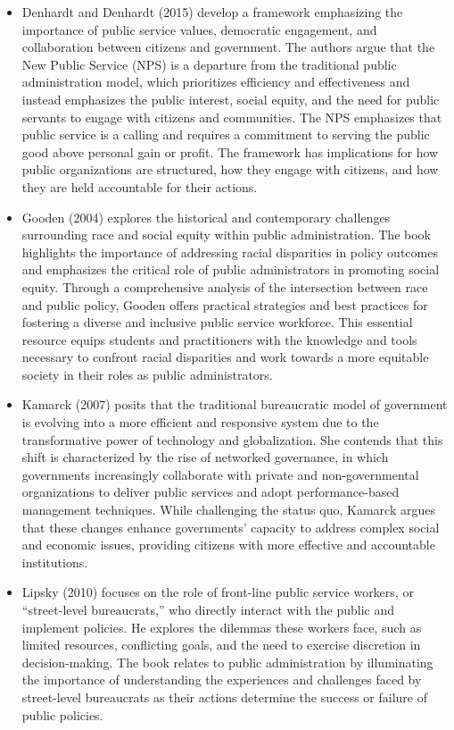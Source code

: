 \documentclass[12pt, letterpaper]{article}
\begin{document}
    \begin{itemize}
        \item Denhardt and Denhardt (2015) develop a framework emphasizing the importance of public service values, democratic engagement, and collaboration between citizens and government. The authors argue that the New Public Service (NPS) is a departure from the traditional public administration model, which prioritizes efficiency and effectiveness and instead emphasizes the public interest, social equity, and the need for public servants to engage with citizens and communities. The NPS emphasizes that public service is a calling and requires a commitment to serving the public good above personal gain or profit. The framework has implications for how public organizations are structured, how they engage with citizens, and how they are held accountable for their actions.
        \item Gooden (2004) explores the historical and contemporary challenges surrounding race and social equity within public administration. The book highlights the importance of addressing racial disparities in policy outcomes and emphasizes the critical role of public administrators in promoting social equity. Through a comprehensive analysis of the intersection between race and public policy, Gooden offers practical strategies and best practices for fostering a diverse and inclusive public service workforce. This essential resource equips students and practitioners with the knowledge and tools necessary to confront racial disparities and work towards a more equitable society in their roles as public administrators.
        \item Kamarck (2007) posits that the traditional bureaucratic model of government is evolving into a more efficient and responsive system due to the transformative power of technology and globalization. She contends that this shift is characterized by the rise of networked governance, in which governments increasingly collaborate with private and non-governmental organizations to deliver public services and adopt performance-based management techniques. While challenging the status quo, Kamarck argues that these changes enhance governments’ capacity to address complex social and economic issues, providing citizens with more effective and accountable institutions.
        \item Lipsky (2010) focuses on the role of front-line public service workers, or ``street-level bureaucrats,'' who directly interact with the public and implement policies. He explores the dilemmas these workers face, such as limited resources, conflicting goals, and the need to exercise discretion in decision-making. The book relates to public administration by illuminating the importance of understanding the experiences and challenges faced by street-level bureaucrats as their actions determine the success or failure of public policies.
    \end{itemize}
\end{document}
